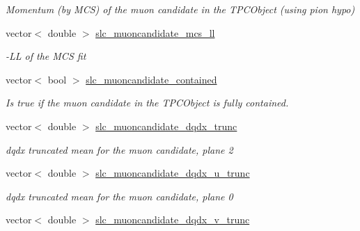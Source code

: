 \begin{DoxyCompactItemize}
\begin{DoxyCompactList}\small\item\em Momentum (by M\-C\-S) of the muon candidate in the T\-P\-C\-Object (using pion hypo) \end{DoxyCompactList}\item 
\hypertarget{classUBXSecEvent_a7342f551004e2275665345afe33d21a2}{vector$<$ double $>$ \hyperlink{classUBXSecEvent_a7342f551004e2275665345afe33d21a2}{slc\-\_\-muoncandidate\-\_\-mcs\-\_\-ll}}\label{classUBXSecEvent_a7342f551004e2275665345afe33d21a2}

\begin{DoxyCompactList}\small\item\em -\/\-L\-L of the M\-C\-S fit \end{DoxyCompactList}\item 
\hypertarget{classUBXSecEvent_acece0aff774df48cee7bd4146870c559}{vector$<$ bool $>$ \hyperlink{classUBXSecEvent_acece0aff774df48cee7bd4146870c559}{slc\-\_\-muoncandidate\-\_\-contained}}\label{classUBXSecEvent_acece0aff774df48cee7bd4146870c559}

\begin{DoxyCompactList}\small\item\em Is true if the muon candidate in the T\-P\-C\-Object is fully contained. \end{DoxyCompactList}\item 
\hypertarget{classUBXSecEvent_aec6e2338e43e8cd376f3eb7f9785b744}{vector$<$ double $>$ \hyperlink{classUBXSecEvent_aec6e2338e43e8cd376f3eb7f9785b744}{slc\-\_\-muoncandidate\-\_\-dqdx\-\_\-trunc}}\label{classUBXSecEvent_aec6e2338e43e8cd376f3eb7f9785b744}

\begin{DoxyCompactList}\small\item\em dqdx truncated mean for the muon candidate, plane 2 \end{DoxyCompactList}\item 
\hypertarget{classUBXSecEvent_adcc89b6ddd486fd6c1eb19c8fb710a04}{vector$<$ double $>$ \hyperlink{classUBXSecEvent_adcc89b6ddd486fd6c1eb19c8fb710a04}{slc\-\_\-muoncandidate\-\_\-dqdx\-\_\-u\-\_\-trunc}}\label{classUBXSecEvent_adcc89b6ddd486fd6c1eb19c8fb710a04}

\begin{DoxyCompactList}\small\item\em dqdx truncated mean for the muon candidate, plane 0 \end{DoxyCompactList}\item 
\hypertarget{classUBXSecEvent_a9640dedc7adeef5eb840fc49b1ce1a33}{vector$<$ double $>$ \hyperlink{classUBXSecEvent_a9640dedc7adeef5eb840fc49b1ce1a33}{slc\-\_\-muoncandidate\-\_\-dqdx\-\_\-v\-\_\-trunc}}\label{classUBXSecEvent_a9640dedc7adeef5eb840fc49b1ce1a33}


\end{DoxyCompactItemize}
